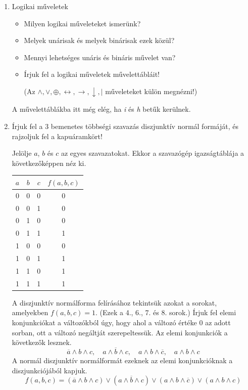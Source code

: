 \documentclass[a4paper]{article}
\newenvironment{solution}
{\color{RoyalBlue}}{\bigskip}
\begin{document}
\begin{enumerate}

\item

Logikai műveletek

\begin{itemize}
	\item Milyen logikai műveleteket ismerünk?
	\item Melyek unárisak és melyek binárisak ezek közül?
	\item Mennyi lehetséges unáris és bináris művelet van?
	\item Írjuk fel a logikai műveletek művelettábláit!
	
	(Az $\wedge, \vee, \oplus, \leftrightarrow, \rightarrow, \downarrow, |$ műveleteket külön megnézni!)
\end{itemize}

\begin{solution}
A művelettáblákba itt még elég, ha \textit{i} és \textit{h} betűk kerülnek.
\end{solution}

\item

Írjuk fel a 3 bemenetes többségi szavazás diszjunktív normál formáját, és rajzoljuk fel a kapuáramkört!

\begin{solution}
Jelölje $a$, $b$ és $c$ az egyes szavazatokat. Ekkor a szavazógép igazságtáblája a következőképpen néz ki.

\begin{center}
\begin{tabular}{|ccc|c|}
$a$ & $b$ & $c$ & $f(a, b, c)$ \\
\hline
0 & 0 & 0 & 0 \\
0 & 0 & 1 & 0 \\
0 & 1 & 0 & 0 \\
0 & 1 & 1 & 1 \\
1 & 0 & 0 & 0 \\
1 & 0 & 1 & 1 \\
1 & 1 & 0 & 1 \\
1 & 1 & 1 & 1 \\
\hline
\end{tabular}
\end{center}

A diszjunktív normálforma felírásához tekintsük azokat a sorokat, amelyekben $f(a, b, c) = 1$. (Ezek a 4., 6., 7. és 8. sorok.) Írjuk fel elemi konjunkciókat a változókból úgy, hogy ahol a változó értéke $0$ az adott sorban, ott a változó negáltját szerepeltessük. Az elemi konjunkciók a következők lesznek.
$$
\overline{a} \wedge b \wedge c, \quad
a \wedge \overline{b} \wedge c, \quad
a \wedge b \wedge \overline{c}, \quad
a \wedge b \wedge c
$$
A normál diszjunktív normálformát ezeknek az elemi konjunkcióknak a diszjunkciójából kapjuk.
$$
f(a, b, c) =
(\overline{a} \wedge b \wedge c) \vee
(a \wedge \overline{b} \wedge c) \vee
(a \wedge b \wedge \overline{c}) \vee
(a \wedge b \wedge c)
$$


\end{solution}
\end{enumerate}
\end{document}
